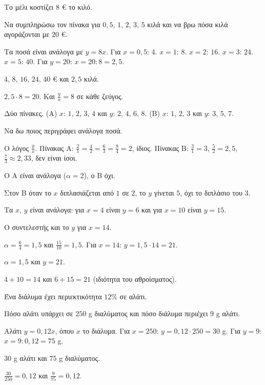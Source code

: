 
\tixero Το μέλι κοστίζει $8$ € το κιλό.\par
\tithelo Να συμπληρώσω τον πίνακα για $0{,}5$, $1$, $2$, $3$, $5$ κιλά και να βρω πόσα κιλά αγοράζονται με $20$ €.\par
\possindeo Τα ποσά είναι ανάλογα με $y=8x$. Για $x=0{,}5$: $4$. $x=1$: $8$. $x=2$: $16$. $x=3$: $24$. $x=5$: $40$. Για $y=20$: $x=20:8=2{,}5$.\par
\apantisi $4,\,8,\,16,\,24,\,40$ € και $2{,}5$ κιλά.\par
\elegxos $2{,}5\cdot8=20$. Και $\frac{y}{x}=8$ σε κάθε ζεύγος.

\tixero Δύο πίνακες. (Α) $x$: $1,\,2,\,3,\,4$ και $y$: $2,\,4,\,6,\,8$. (Β) $x$: $1,\,2,\,3$ και $y$: $3,\,5,\,7$.\par
\tithelo Να δω ποιος περιγράφει ανάλογα ποσά.\par
\possindeo Ο λόγος $\frac{y}{x}$. Πίνακας Α: $\frac{2}{1}=\frac{4}{2}=\frac{6}{3}=\frac{8}{4}=2$, ίδιος. Πίνακας Β: $\frac{3}{1}=3$, $\frac{5}{2}=2{,}5$, $\frac{7}{3}\approx2{,}33$, δεν είναι ίσοι.\par
\apantisi Ο Α είναι ανάλογα ($\alpha=2$), ο Β όχι.\par
\elegxos Στον Β όταν το $x$ διπλασιάζεται από $1$ σε $2$, το $y$ γίνεται $5$, όχι το διπλάσιο του $3$.

\tixero Τα $x,\,y$ είναι ανάλογα: για $x=4$ είναι $y=6$ και για $x=10$ είναι $y=15$.\par
\tithelo Ο συντελεστής και το $y$ για $x=14$.\par
\possindeo $\alpha=\frac{6}{4}=1{,}5$ και $\frac{15}{10}=1{,}5$. Για $x=14$: $y=1{,}5\cdot14=21$.\par
\apantisi $\alpha=1{,}5$ και $y=21$.\par
\elegxos $4+10=14$ και $6+15=21$ (ιδιότητα του αθροίσματος).

\tixero Ένα διάλυμα έχει περιεκτικότητα $12\%$ σε αλάτι.\par
\tithelo Πόσο αλάτι υπάρχει σε $250$ g διαλύματος και πόσο διάλυμα περιέχει $9$ g αλάτι.\par
\possindeo Αλάτι $y=0{,}12x$, όπου $x$ το διάλυμα. Για $x=250$: $y=0{,}12\cdot250=30$ g. Για $y=9$: $x=9:0{,}12=75$ g.\par
\apantisi $30$ g αλάτι και $75$ g διαλύματος.\par
\elegxos $\frac{30}{250}=0{,}12$ και $\frac{9}{75}=0{,}12$.

